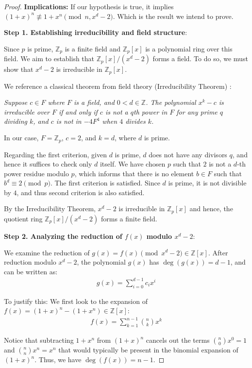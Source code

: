\documentclass{article}
\theoremstyle{plain}
\theoremstyle{definition}
\begin{document}
\begin{proof}
\textbf{Implications:}
If our hypothesis is true, it implies $(1 + x)^n \not\equiv 1 + x^n \pmod{n, x^d-2}$. Which is the result we intend to prove.

\textbf{Step 1. Establishing irreducibility and field structure}:

Since $p$ is prime, $\mathbb{Z}_p$ is a finite field and $\mathbb{Z}_p[x]$ is a polynomial ring over this field. We aim to establish that $\mathbb{Z}_p[x]/(x^d - 2)$ forms a field. To do so, we must show that $x^d - 2$ is irreducible in $\mathbb{Z}_p[x]$.

We reference a classical theorem from field theory (Irreducibility Theorem) \cite{karpilovsky1989fields}:

\textit{Suppose $c \in F$ where $F$ is a field, and $0 < d \in \mathbb{Z}$. The polynomial $x^k - c$ is irreducible over $F$ if and only if $c$ is not a $q$th power in $F$ for any prime $q$ dividing $k$, and $c$ is not in $-4F^4$ when $4$ divides $k$.}

In our case, $F = \mathbb{Z}_p$, $c = 2$, and $k = d$, where $d$ is prime.

Regarding the first criterion, given $d$ is prime, $d$ does not have any divisors $q$, and hence it suffices to check only $d$ itself. We have chosen $p$ such that $2$ is not a $d$-th power residue modulo $p$, which informs that there is no element $b \in F$ such that $b^d \equiv 2 \pmod{p}$. The first criterion is satisfied. Since $d$ is prime, it is not divisible by $4$, and thus second criterion is also satisfied.

By the Irreducibility Theorem, $x^d - 2$ is irreducible in $\mathbb{Z}_p[x]$ and hence, the quotient ring $\mathbb{Z}_p[x]/(x^d - 2)$ forms a finite field.

\textbf{Step 2. Analyzing the reduction of $f(x)$ modulo $x^d - 2$}:

We examine the reduction of $g(x) = f(x) \pmod{x^d - 2} \in \mathbb{Z}[x]$. After reduction modulo $x^d - 2$, the polynomial $g(x)$ has $\deg(g(x)) = d-1$, and can be written as:
\begin{align}
    g(x) = \sum_{i=0}^{d-1} c_i x^i
\end{align}

To justify this: We first look to the expansion of  $f(x) = (1 + x)^n - (1 + x^n) \in \mathbb{Z}[x]$:
\begin{align}
    f(x) = \sum_{k=1}^{n-1} \binom{n}{k} x^k
\end{align}

Notice that subtracting $1+x^n$ from $(1+x)^n$ cancels out the terms $\binom{n}{0} x^0 = 1$ and $\binom{n}{n} x^n = x^n$ that would typically be present in the binomial expansion of $(1+x)^n$. Thus, we have $\deg(f(x))=n-1$.


\end{proof}
\end{document}
